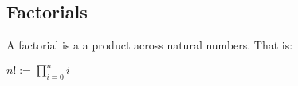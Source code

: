 
\subsection{Factorials}

A factorial is a a product across natural numbers. That is:

$n!:=\prod^n_{i=0}i$

